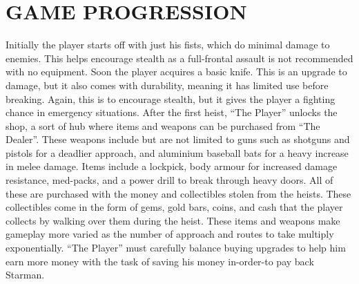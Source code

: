 \documentclass{article}
\begin{document}
\section{GAME PROGRESSION \label{progression}}
Initially the player starts off with just his fists, which do minimal damage to enemies. This helps encourage stealth as a full-frontal assault is not recommended with no equipment. Soon the player acquires a basic knife. This is an upgrade to damage, but it also comes with durability, meaning it has limited use before breaking. Again, this is to encourage stealth, but it gives the player a fighting chance in emergency situations.
\bigbreak
After the first heist, “The Player” unlocks the shop, a sort of hub where items and weapons can be purchased from “The Dealer”. These weapons include but are not limited to guns such as shotguns and pistols for a deadlier approach, and aluminium baseball bats for a heavy increase in melee damage.
\bigbreak
Items include a lockpick, body armour for increased damage resistance, med-packs, and a power drill to break through heavy doors.
 \bigbreak
All of these are purchased with the money and collectibles stolen from the heists. These collectibles come in the form of gems, gold bars, coins, and cash that the player collects by walking over them during the heist.
\bigbreak
These items and weapons make gameplay more varied as the number of approach and routes to take multiply exponentially. “The Player” must carefully balance buying upgrades to help him earn more money with the task of saving his money in-order-to pay back Starman.
\end{document}
